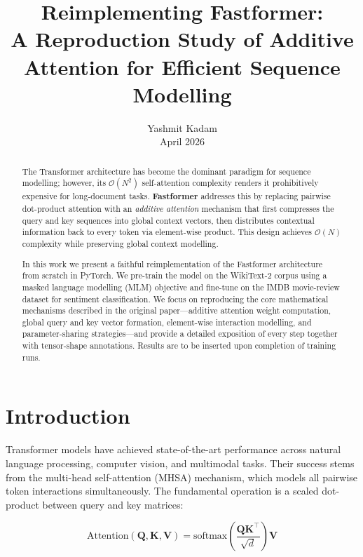 \documentclass[11pt,a4paper]{article}
\title{
  \vspace{-1em}
  {\Large \textbf{Reimplementing Fastformer:}}\\[0.4em]
  {\large A Reproduction Study of Additive Attention for Efficient Sequence Modelling}\\[1em]
}
\author{
  Yashmit Kadam \\
  \small{April 2026}
}
\date{}
\newcommand{\mat}[1]{\mathbf{#1}}
\theoremstyle{definition}
\begin{document}
\maketitle
\thispagestyle{empty}

\begin{abstract}
The Transformer architecture has become the dominant paradigm
for sequence modelling; however, its $\mathcal{O}(N^{2})$ self-attention complexity renders it
prohibitively expensive for long-document tasks.
\textbf{Fastformer} addresses this by replacing pairwise dot-product
attention with an \emph{additive attention} mechanism that first compresses the query and key
sequences into global context vectors, then distributes contextual information back to every
token via element-wise product.
This design achieves $\mathcal{O}(N)$ complexity while preserving global context modelling.

In this work we present a faithful reimplementation of the Fastformer architecture from scratch
in PyTorch.
We pre-train the model on the WikiText-2 corpus using a masked language modelling (MLM)
objective and fine-tune on the IMDB movie-review dataset for  sentiment classification.
We focus on reproducing the core mathematical mechanisms described in the original paper---additive
attention weight computation, global query and key vector formation, element-wise interaction
modelling, and parameter-sharing strategies---and provide a detailed exposition of every step
together with tensor-shape annotations.
Results are to be inserted upon completion of training runs.
\end{abstract}

\section{Introduction}
\label{sec:intro}

Transformer models have achieved state-of-the-art performance across natural language processing,
computer vision, and multimodal tasks.
Their success stems from the multi-head self-attention (MHSA) mechanism, which models all
pairwise token interactions simultaneously.
The fundamental operation is a scaled dot-product between query and key matrices:

\begin{equation}
\text{Attention}(\mat{Q},\mat{K},\mat{V}) =
  \text{softmax}\!\left(\frac{\mat{Q}\mat{K}^{\top}}{\sqrt{d}}\right)\mat{V}
  \label{eq:vanilla_attn}
\end{equation}
\end{document}
